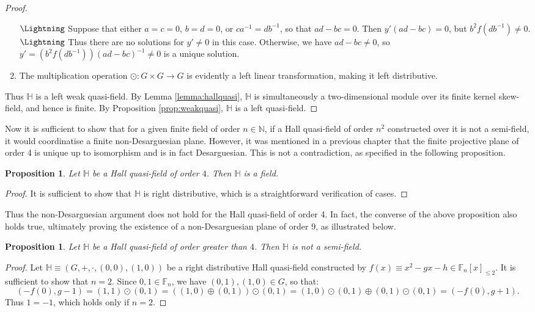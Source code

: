 \documentclass{report}
\newcommand{\N}{\mathbb{N}}
\newcommand{\F}{\mathbb{F}}
\renewcommand{\H}{\mathbb{H}}
\newtheorem{proposition}[theorem]{Proposition}
\theoremstyle{definition}\newtheorem*{definition}{Definition}
\theoremstyle{definition}\newtheorem*{example}{Example}
\theoremstyle{remark}\newtheorem*{remark}{Remark}
\begin{document}
\begin{proof}
\begin{enumerate}
    $ \text{\Lightning} $ Suppose that either $ a = c = 0 $, $ b = d = 0 $, or $ ca^{-1} = db^{-1} $, so that $ ad - bc = 0 $. Then $ y' (ad - bc) = 0 $, but $ b^2 f(db^{-1}) \ne 0 $. $ \text{\Lightning} $ Thus there are no solutions for $ y' \ne 0 $ in this case. Otherwise, we have $ ad - bc \ne 0 $, so $ y' = (b^2 f(db^{-1})) (ad - bc)^{-1} \ne 0 $ is a unique solution.
  \item The multiplication operation $ \odot : G \times G \to G $ is evidently a left linear transformation, making it left distributive.
\end{enumerate}
Thus $ \H $ is a left weak quasi-field. By Lemma \ref{lemma:hallquasi}, $ \H $ is simultaneously a two-dimensional module over its finite kernel skew-field, and hence is finite. By Proposition \ref{prop:weakquasi}, $ \H $ is a left quasi-field.
\end{proof}

Now it is sufficient to show that for a given finite field of order $ n \in \N $, if a Hall quasi-field of order $ n^2 $ constructed over it is not a semi-field, it would coordinatise a finite non-Desarguesian plane. However, it was mentioned in a previous chapter that the finite projective plane of order 4 is unique up to isomorphism and is in fact Desarguesian. This is not a contradiction, as specified in the following proposition.

\begin{proposition}
Let $ \H $ be a Hall quasi-field of order $ 4 $. Then $ \H $ is a field.
\end{proposition}

\begin{proof}
It is sufficient to show that $ \H $ is right distributive, which is a straightforward verification of cases.
\end{proof}

Thus the non-Desarguesian argument does not hold for the Hall quasi-field of order 4. In fact, the converse of the above proposition also holds true, ultimately proving the existence of a non-Desarguesian plane of order 9, as illustrated below.

\begin{proposition}
Let $ \H $ be a Hall quasi-field of order greater than $ 4 $. Then $ \H $ is not a semi-field.
\end{proposition}

\begin{proof}
Let $ \H \equiv (G, +, \cdot, (0, 0), (1, 0)) $ be a right distributive Hall quasi-field constructed by $ f(x) \equiv x^2 - gx - h \in \F_n[x]_{\le 2} $. It is sufficient to show that $ n = 2 $. Since $ 0, 1 \in \F_n $, we have $ (0, 1), (1, 0) \in G $, so that: $$ (-f(0), g - 1) = (1, 1) \odot (0, 1) = ((1, 0) \oplus (0, 1)) \odot (0, 1) = (1, 0) \odot (0, 1) \oplus (0, 1) \odot (0, 1) = (-f(0), g + 1). $$ Thus $ 1 = -1 $, which holds only if $ n = 2 $.
\end{proof}
\end{document}
